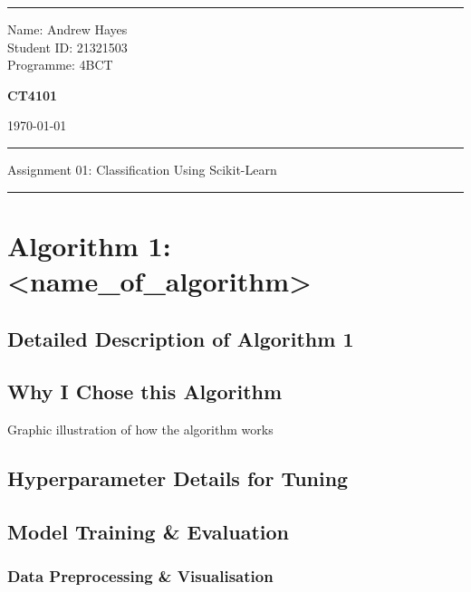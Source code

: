 \documentclass[a4paper]{article}
\begin{document}
\hrule \medskip
\begin{minipage}{0.295\textwidth} 
    \raggedright
    \footnotesize 
    Name: Andrew Hayes \\
    Student ID: 21321503 \hfill \\
    Programme: 4BCT \hfill
\end{minipage}
\begin{minipage}{0.4\textwidth} 
    \centering 
    \vspace{0.4em}
    \Large 
    \textbf{CT4101} \\ 
\end{minipage}
\begin{minipage}{0.295\textwidth} 
    \raggedleft
    \today
\end{minipage}
\medskip\hrule 
\begin{center}
    \normalsize
    Assignment 01: Classification Using Scikit-Learn
\end{center}
\hrule

\section{Algorithm 1: <name\_of\_algorithm>}

\subsection{Detailed Description of Algorithm 1}
\subsection{Why I Chose this Algorithm}

Graphic illustration of how the algorithm works

\subsection{Hyperparameter Details for Tuning}

\subsection{Model Training \& Evaluation}
\subsubsection{Data Preprocessing \& Visualisation}
\end{document}
